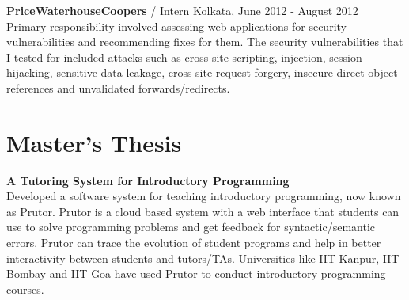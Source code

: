 \documentclass[margin,line]{res}
\begin{document}
\begin{resume}
{\bf PriceWaterhouseCoopers} / Intern {\hfill} Kolkata, June 2012 - August 2012 \\
Primary responsibility involved assessing web applications for security vulnerabilities and recommending fixes for them. The security vulnerabilities that I tested for included attacks such as cross-site-scripting, injection, session hijacking, sensitive data leakage, cross-site-request-forgery, insecure direct object references and unvalidated forwards/redirects. 

\section{\sc Master's Thesis}
{\bf A Tutoring System for Introductory Programming} \\
Developed a software system for teaching introductory programming, now known as Prutor. Prutor is a cloud based system with a web interface that students can use to solve programming problems and get feedback for syntactic/semantic errors. Prutor can trace the evolution of student programs and help in better interactivity between students and tutors/TAs. Universities like IIT Kanpur, IIT Bombay and IIT Goa have used Prutor to conduct introductory programming courses.

\begin{comment}
\section{\sc Key Academic Projects}

{\bf Handwritten Alphanumeric Character Recognition} \\
{\em For partial fulfillment of a Machine Learning course} \\
Project involved recognizing handwritten characters. We had a large dataset of tagged handwritten characters which was used to train and test. We used features such as zoning, number of intersections with horizontal/vertical lines, stroke angles, contours and straightness index. The classifiers used included Neural Networks, SVMs and Random Forests.

{\bf Similar Category Differentiation of Objects} \\
{\em For partial fulfillment of a Computer Vision course} \\
Project involved differentiating between similar categories of images such as flowers and birds. Features used include dense SIFT with Fisher kernel for each individual colour channel. The features were tested on classifiers AdaBoost and SVM.


\end{comment}
\end{resume}
\end{document}
